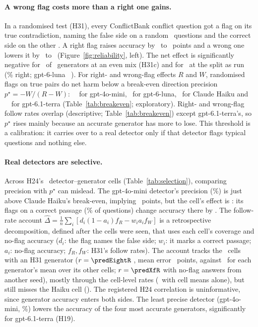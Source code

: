 \paragraph{A wrong flag costs more than a right one gains.} In a randomised test (H31), every ConflictBank conflict
question got a flag on its true contradiction, naming the false side on a random \nRandRight\ questions and the
correct side on the other \nRandWrong. A right flag raises accuracy by \hThirtyOneAMin\ to \hThirtyOneAMax\ points and
a wrong one lowers it by \ahThirtyOneBMax\ to \ahThirtyOneBMin\ (Figure~\ref{fig:reliability}, left). The net effect is
significantly negative for \nHThirtyOneCSig\ of \nHThirtyOneCTests\ generators at an even mix (H31c) and for
\nRealThirtyOneSig\ at the split as run (\shareRight\% right; gpt-6-luna \realThirtyOneLuna\ \realThirtyOneLunaCI).
For right- and wrong-flag effects $R$ and $W$, randomised flags on true pairs do net harm below a break-even
direction precision $p^\star=-W/(R-W)$: \beMini\ \beMiniCI\ for gpt-4o-mini, \beLuna\ for gpt-6-luna, \beHaiku\ for Claude
Haiku and \beTerra\ \beTerraCI\ for gpt-6.1-terra (Table~\ref{tab:breakeven}; exploratory). Right- and wrong-flag
follow rates overlap (descriptive; Table~\ref{tab:breakeven}) except gpt-6.1-terra's, so $p^\star$ rises mainly
because an accurate generator has more to lose. This threshold is a calibration: it carries over to a real detector only if
that detector flags typical questions and nothing else.

\paragraph{Real detectors are selective.} Across H24's \hTwentyFourCells\ detector--generator cells
(Table~\ref{tab:selection}), comparing precision with $p^\star$ can mislead. The gpt-4o-mini detector's precision
(\selHaikuMiniPrec\%) is just above Claude Haiku's break-even, implying \selHaikuMiniMarg\ points, but the cell's effect is
\selHaikuMiniObs: its flags on a correct passage (\selHaikuMiniWrongShare\% of questions) change accuracy there by
\selHaikuMiniWrongGain. The follow-rate account
$\hat\Delta=\frac1n\sum_i[d_i(1-a_i)f_R-w_ia_if_W]$ is a retrospective decomposition, defined after the cells were
seen, that uses each cell's coverage and no-flag accuracy ($d_i$: the flag
names the false side; $w_i$: it marks a correct passage; $a_i$: no-flag accuracy; $f_R,f_W$: H31's follow rates). The
account tracks the \predEightN\ cells with an H31 generator
($r=\predEightR$ \predEightRCI, mean error \predEightMae\ points, against \predGenMae\ for each generator's mean over
its other cells; $r=\predXfR$ with no-flag answers from another seed), mostly through the cell-level rates
(\predMargMae\ with cell means alone), but still misses the Haiku cell (\predHaikuMini). The registered H24 correlation is uninformative, since generator accuracy
enters both sides. The least precise detector (gpt-4o-mini, \dirPrecMini\%) lowers the accuracy of the four most
accurate generators, significantly for gpt-6.1-terra (H19).

